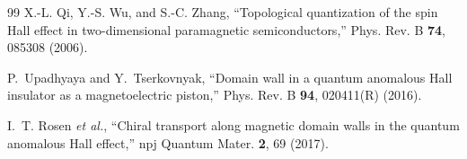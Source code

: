 \documentclass[aps,twocolumn,floatfix,superscriptaddress,nofootinbib]{revtex4-2}
\begin{document}
\begin{thebibliography}{99}
X.-L. Qi, Y.-S. Wu, and S.-C. Zhang,
``Topological quantization of the spin Hall effect in two-dimensional paramagnetic semiconductors,''
Phys. Rev. B \textbf{74}, 085308 (2006).

P.~Upadhyaya and Y.~Tserkovnyak,
``Domain wall in a quantum anomalous Hall insulator as a magnetoelectric piston,''
Phys. Rev. B \textbf{94}, 020411(R) (2016).

I.~T. Rosen \textit{et al.},
``Chiral transport along magnetic domain walls in the quantum anomalous Hall effect,''
npj Quantum Mater. \textbf{2}, 69 (2017).

\end{thebibliography}
\end{document}
